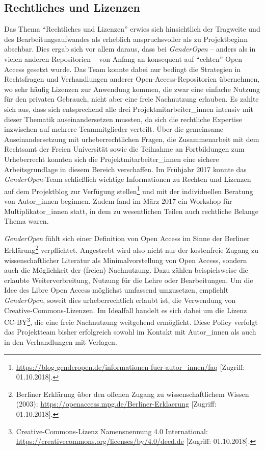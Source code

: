 \documentclass[a4paper,
fontsize=11pt,
oneside,
numbers=noperiodatend,
parskip=half-,
bibliography=totoc,
final
]{scrartcl}
\begin{document}
\hypertarget{rechtliches-und-lizenzen}{%
\subsection{Rechtliches und Lizenzen}\label{rechtliches-und-lizenzen}}

Das Thema \enquote{Rechtliches und Lizenzen} erwies sich hinsichtlich
der Tragweite und des Bearbeitungsaufwandes als erheblich
anspruchsvoller als zu Projektbeginn absehbar. Dies ergab sich vor allem
daraus, dass bei \emph{GenderOpen} -- anders als in vielen anderen
Repositorien -- von Anfang an konsequent auf \enquote{echten} Open
Access gesetzt wurde. Das Team konnte dabei nur bedingt die Strategien
in Rechtsfragen und Verhandlungen anderer Open-Access-Repositorien
übernehmen, wo sehr häufig Lizenzen zur Anwendung kommen, die zwar eine
einfache Nutzung für den privaten Gebrauch, nicht aber eine freie
Nachnutzung erlauben. Es zahlte sich aus, dass sich entsprechend alle
drei Projektmitarbeiter\_innen intensiv mit dieser Thematik
auseinandersetzen mussten, da sich die rechtliche Expertise inzwischen
auf mehrere Teammitglieder verteilt. Über die gemeinsame
Auseinandersetzung mit urheberrechtlichen Fragen, die Zusammenarbeit mit
dem Rechtsamt der Freien Universität sowie die Teilnahme an
Fortbildungen zum Urheberrecht konnten sich die
Projektmitarbeiter\_innen eine sichere Arbeitsgrundlage in diesem
Bereich verschaffen. Im Frühjahr 2017 konnte das \emph{GenderOpen}-Team
schließlich wichtige Informationen zu Rechten und Lizenzen auf dem
Projektblog zur Verfügung stellen\footnote{\url{https://blog-genderopen.de/informationen-fuer-autor_innen/faq}
  {[}Zugriff: 01.10.2018{]}.} und mit der individuellen Beratung von
Autor\_innen beginnen. Zudem fand im März 2017 ein Workshop für
Multiplikator\_innen statt, in dem zu wesentlichen Teilen auch
rechtliche Belange Thema waren.

\emph{GenderOpen} fühlt sich einer Definition von Open Access im Sinne
der Berliner Erklärung\footnote{Berliner Erklärung über den offenen
  Zugang zu wissenschaftlichem Wissen (2003):
  \url{https://openaccess.mpg.de/Berliner-Erklaerung} {[}Zugriff:
  01.10.2018{]}.} verpflichtet. Angestrebt wird also nicht nur der
kostenfreie Zugang zu wissenschaftlicher Literatur als
Minimalvorstellung von Open Access, sondern auch die Möglichkeit der
(freien) Nachnutzung. Dazu zählen beispielsweise die erlaubte
Weiterverbreitung, Nutzung für die Lehre oder Bearbeitungen. Um die Idee
des Libre Open Access möglichst umfassend umzusetzen, empfiehlt
\emph{GenderOpen}, soweit dies urheberrechtlich erlaubt ist, die
Verwendung von Creative-Commons-Lizenzen. Im Idealfall handelt es sich
dabei um die Lizenz CC-BY\footnote{Creative-Commons-Lizenz Namensnennung
  4.0 International:
  \url{https://creativecommons.org/licenses/by/4.0/deed.de} {[}Zugriff:
  01.10.2018{]}.}, die eine freie Nachnutzung weitgehend ermöglicht.
Diese Policy verfolgt das Projektteam bisher erfolgreich sowohl im
Kontakt mit Autor\_innen als auch in den Verhandlungen mit Verlagen.
\end{document}
